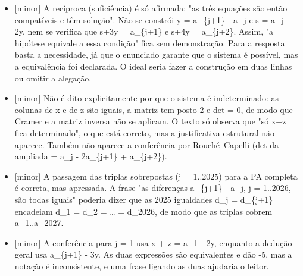\documentclass{article}%
\begin{document}
\begin{itemize}%
\item%
{[}minor{]} A recíproca (suficiência) é só afirmada: "as três equações são então compatíveis e têm solução". Não se constrói y = a\_\{j+1\} - a\_j e s = a\_j - 2y, nem se verifica que s+3y = a\_\{j+1\} e s+4y = a\_\{j+2\}. Assim, "a hipótese equivale a essa condição" fica sem demonstração. Para a resposta basta a necessidade, já que o enunciado garante que o sistema é possível, mas a equivalência foi declarada. O ideal seria fazer a construção em duas linhas ou omitir a alegação.%
\item%
{[}minor{]} Não é dito explicitamente por que o sistema é indeterminado: as colunas de x e de z são iguais, a matriz tem posto 2 e det = 0, de modo que Cramer e a matriz inversa não se aplicam. O texto só observa que "só x+z fica determinado", o que está correto, mas a justificativa estrutural não aparece. Também não aparece a conferência por Rouché--Capelli (det da ampliada = a\_j - 2a\_\{j+1\} + a\_\{j+2\}).%
\item%
{[}minor{]} A passagem das triplas sobrepostas (j = 1..2025) para a PA completa é correta, mas apressada. A frase "as diferenças a\_\{j+1\} - a\_j, j = 1..2026, são todas iguais" poderia dizer que as 2025 igualdades d\_j = d\_\{j+1\} encadeiam d\_1 = d\_2 = \ldots{} = d\_2026, de modo que as triplas cobrem a\_1..a\_2027.%
\item%
{[}minor{]} A conferência para j = 1 usa x + z = a\_1 - 2y, enquanto a dedução geral usa a\_\{j+1\} - 3y. As duas expressões são equivalentes e dão -5, mas a notação é inconsistente, e uma frase ligando as duas ajudaria o leitor.%
\end{itemize}%
\end{document}
